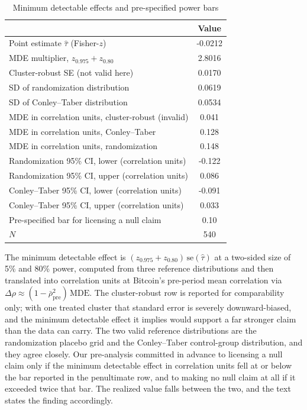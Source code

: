 \begin{table}[t]
\centering
\begin{threeparttable}
\caption{Minimum detectable effects and pre-specified power bars}
\label{tab:power}
\begin{tabular}{lc}
\toprule
 & Value \\
\midrule
Point estimate $\hat\tau$ (Fisher-$z$) & -0.0212 \\
MDE multiplier, $z_{0.975}+z_{0.80}$ & 2.8016 \\
Cluster-robust SE (not valid here) & 0.0170 \\
SD of randomization distribution & 0.0619 \\
SD of Conley--Taber distribution & 0.0534 \\
MDE in correlation units, cluster-robust (invalid) & 0.041 \\
MDE in correlation units, Conley--Taber & 0.128 \\
MDE in correlation units, randomization & 0.148 \\
Randomization 95\% CI, lower (correlation units) & -0.122 \\
Randomization 95\% CI, upper (correlation units) & 0.086 \\
Conley--Taber 95\% CI, lower (correlation units) & -0.091 \\
Conley--Taber 95\% CI, upper (correlation units) & 0.033 \\
Pre-specified bar for licensing a null claim & 0.10 \\
$N$ & 540 \\
\bottomrule
\end{tabular}
\begin{tablenotes}[flushleft]
\footnotesize
\item The minimum detectable effect is $(z_{0.975}+z_{0.80})\,\mathrm{se}(\hat\tau)$ at a two-sided size of 5\% and 80\% power, computed from three reference distributions and then translated into correlation units at Bitcoin's pre-period mean correlation via $\Delta\rho \approx (1-\bar\rho_{\mathrm{pre}}^2)\,\mathrm{MDE}$. The cluster-robust row is reported for comparability only; with one treated cluster that standard error is severely downward-biased, and the minimum detectable effect it implies would support a far stronger claim than the data can carry. The two valid reference distributions are the randomization placebo grid and the Conley--Taber control-group distribution, and they agree closely. Our pre-analysis committed in advance to licensing a null claim only if the minimum detectable effect in correlation units fell at or below the bar reported in the penultimate row, and to making no null claim at all if it exceeded twice that bar. The realized value falls between the two, and the text states the finding accordingly.
\end{tablenotes}
\end{threeparttable}
\end{table}
